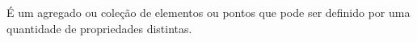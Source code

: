 \documentclass[../../main]{subfiles}
\begin{document}
    \begin{defi}[Conjunto]\label{defi:conjunto}
        É um agregado ou coleção de elementos ou pontos que pode ser definido por uma quantidade de propriedades distintas.
    \end{defi}
\end{document}
